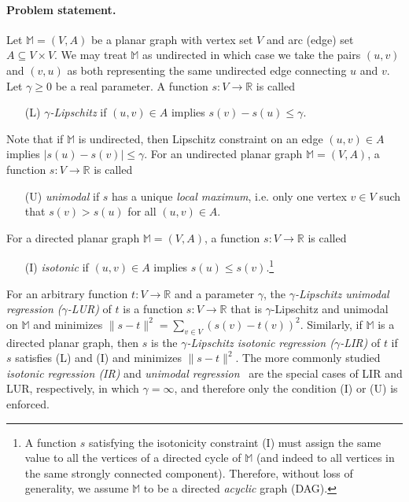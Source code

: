 \documentclass[11pt]{article}
\def\MM{\mathbb{M}}
\def\reals{\mathbb{R}}
\begin{document}
\paragraph{Problem statement.} 

Let $\MM = (V, A)$ be a planar graph with vertex set $V$ and arc (edge) set $A \subseteq V \times V$. We may treat $\MM$ as undirected in which case we take the pairs $(u, v)$ and $(v, u)$ as both representing the same undirected edge connecting $u$ and $v$.
Let $\gamma \geq 0$ be a real
parameter. A function $s: V \rightarrow \mathbb{R}$ is called
\begin{itemize} 
\item [(L)]{\em $\gamma$-Lipschitz} if  $(u, v) \in A$ implies $s(v) - s(u) \leq \gamma$.
\end{itemize}
Note that if $\MM$ is undirected, then Lipschitz constraint on an edge $(u,v) \in A$ implies $|s(u)-s(v)| \le \gamma$.  
For an undirected planar graph $\MM=(V,A)$, a function 
$s: V \rightarrow \reals$ is called
\begin{itemize}
\item [(U)]{\em unimodal} if $s$ has a unique {\em local maximum}, i.e. only one vertex $v \in V$ such that $s(v) > s(u)$ for all $(u, v) \in A$.
\end{itemize}
For a directed planar graph $\MM=(V,A)$, a function 
$s: V \rightarrow \reals$ is called
\begin{itemize}
\item [(I)]{\em isotonic} if $(u, v) \in A$ implies 
$s(u) \leq s(v)$.\footnote{A function $s$ satisfying the isotonicity constraint (I) must assign 
the same value to all the vertices of a directed cycle of $\MM$ 
(and indeed to all vertices in the same strongly connected component). 
Therefore, without loss of generality, we assume 
$\MM$ to be a directed {\em acyclic} graph (DAG).}
\end{itemize}
For an arbitrary function $t: V \rightarrow \mathbb{R}$ and a 
parameter $\gamma$, the {\em $\gamma$-Lipschitz unimodal regression 
($\gamma$-LUR\/)} of $t$ is a function $s: V \rightarrow \mathbb{R}$ 
that is $\gamma$-Lipschitz and unimodal on $\MM$ and 
minimizes $\|s - t\|^2  = \sum_{v \in V} (s(v) - t(v))^2$. 
Similarly, if $\MM$ is a directed planar graph, then 
$s$ is the {\em $\gamma$-Lipschitz isotonic regression 
($\gamma$-LIR\/)} of $t$ if $s$ satisfies (L) and (I) and 
minimizes $\|s - t\|^2$.
The more commonly studied {\em isotonic regression (IR)\/} and \emph{unimodal
regression}~\cite{AHKW06,ABERS55,BBBB72,Preparata:85} are the special cases of 
LIR and LUR, respectively, in which  $\gamma = \infty$, and therefore only the 
condition (I) or (U) is enforced.
\end{document}
